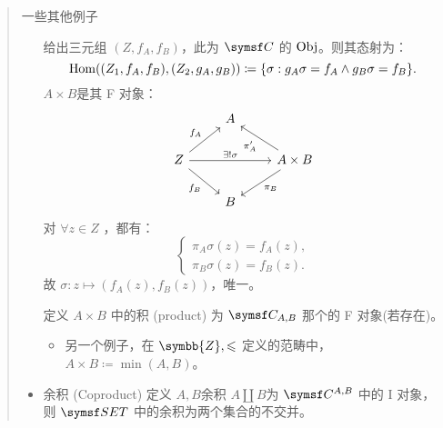 \begin{quote}{一些其他例子}
\begin{itemize}
              给出三元组 \((Z,f_A,f_B)\)，此为 \(\symsf C\) 的 \(\operatorname{Obj}\)。则其态射为：
              \[
                  \Hom\left( (Z_1,f_A,f_B),(Z_2,g_A,g_B) \right) \coloneqq \left\{ \sigma:g_A\sigma = f_A\land g_B\sigma = f_B \right\}
                  .\]
              \(A\times B\)是其 F 对象：
              \[
                  \begin{tikzcd}
                      {}                                                                & A  & {}                                                  \\
                      Z\arrow[ur, "f_A"]\arrow[dr, "f_B"']\arrow[rr, "\exists !\sigma"] & {} & A\times B \arrow[ul, "\pi _A'"]\arrow[ld, "\pi _B"] \\
                      {}                                                                & B  & {}
                  \end{tikzcd}
              \]
              对 \(\forall z\in Z\) ，都有：
              \[
                  \begin{cases}
                      \pi _A\sigma (z) = f_A(z), \\
                      \pi _B\sigma(z) = f_B(z).
                  \end{cases}
              \]
              故 \(\sigma : z\mapsto \left( f_A(z), f_B(z) \right) \)，唯一。

              定义 \(A \times B\) 中的积 (product) 为 \(\symsf C_{A,B}\) 那个的 F 对象(若存在)。
              \begin{itemize}
                  \item 另一个例子，在 \(\symbb{Z}, \leqslant \) 定义的范畴中， \(A\times B\coloneqq \min(A,B)\)。
              \end{itemize}
        \item 余积 (Coproduct)
              定义 \(A,B\)余积 \(A\amalg B\)为 \(\symsf C^{A,B}\) 中的 I 对象，则 \(\SET\) 中的余积为两个集合的不交并。


\end{itemize}
\end{quote}
